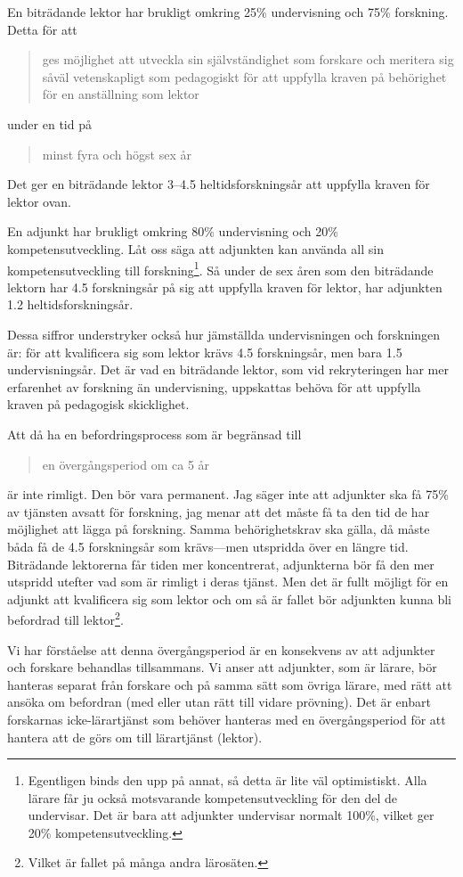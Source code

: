 \documentclass[a4paper,oneside,article,swedish]{memoir}
\begin{document}
En biträdande lektor har brukligt omkring 25\% undervisning och 75\% forskning.
Detta för att
\blockcquote[kap.~4, 12 a §]{Högskoleförordningen}{%
  ges möjlighet att utveckla sin självständighet som forskare och meritera sig 
  såväl vetenskapligt som pedagogiskt för att uppfylla kraven på behörighet för 
  en anställning som lektor%
} under en tid på
\blockcquote[kap.~4, 12 a §]{Högskoleförordningen}{%
  minst fyra och högst sex år%
}.
Det ger en biträdande lektor 3--4.5 heltidsforskningsår att uppfylla kraven för 
lektor ovan.

En adjunkt har brukligt omkring 80\% undervisning och 20\% kompetensutveckling.
Låt oss säga att adjunkten kan använda all sin kompetensutveckling till 
forskning\footnote{%
  Egentligen binds den upp på annat, så detta är lite väl optimistiskt.
  Alla lärare får ju också motsvarande kompetensutveckling för den del de 
  undervisar.
  Det är bara att adjunkter undervisar normalt 100\%, vilket ger 20\% 
  kompetensutveckling.
}.
Så under de sex åren som den biträdande lektorn har 4.5 forskningsår på sig att 
uppfylla kraven för lektor, har adjunkten 1.2 heltidsforskningsår.

Dessa siffror understryker också hur jämställda undervisningen och forskningen 
är:
för att kvalificera sig som lektor krävs 4.5 forskningsår, men bara 1.5 
undervisningsår.
Det är vad en biträdande lektor, som vid rekryteringen har mer erfarenhet av 
forskning än undervisning, uppskattas behöva för att uppfylla kraven på 
pedagogisk skicklighet.

Att då ha en befordringsprocess som är begränsad till
\blockcquote[s.~2]{utredning}{%
  en övergångsperiod om ca 5 år%
} är inte rimligt.
Den bör vara permanent.
Jag säger inte att adjunkter ska få 75\% av tjänsten avsatt för forskning, jag 
menar att det måste få ta den tid de har möjlighet att lägga på forskning.
Samma behörighetskrav ska gälla, då måste båda få de 4.5 forskningsår som 
krävs---men utspridda över en längre tid.
Biträdande lektorerna får tiden mer koncentrerat, adjunkterna bör få den mer 
utspridd utefter vad som är rimligt i deras tjänst.
Men det är fullt möjligt för en adjunkt att kvalificera sig som lektor och om 
så är fallet bör adjunkten kunna bli befordrad till lektor\footnote{%
  Vilket är fallet på många andra lärosäten.
}.

Vi har förståelse att denna övergångsperiod är en konsekvens av att adjunkter 
och forskare behandlas tillsammans.
Vi anser att adjunkter, som är lärare, bör hanteras separat från forskare och 
på samma sätt som övriga lärare, med rätt att ansöka om befordran (med eller 
utan rätt till vidare prövning).
Det är enbart forskarnas icke-lärartjänst som behöver hanteras med en 
övergångsperiod för att hantera att de görs om till lärartjänst (lektor).
\end{document}
